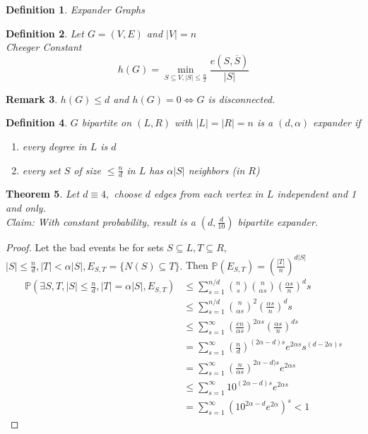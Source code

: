 \documentclass[a4paper]{article}
\newtheorem{thm}{Theorem}[section]
\newtheorem{defn}[thm]{Definition}
\newtheorem{rmk}[thm]{Remark}
\begin{document}
\begin{defn}
    Expander Graphs
\end{defn}
\begin{defn}
    Let $G=(V,E)$ and $|V|=n$\\
    Cheeger Constant $$h(G)=\min_{S\subseteq V, |S|\leq \frac{n}{2}}\frac{e(S,\overline{S})}{|S|}$$
\end{defn}
\begin{rmk}
    $h(G)\leq d$ and $h(G)=0\iff G$ is disconnected. 
\end{rmk}
\begin{defn}
    $G$ bipartite on $(L,R)$ with $|L|=|R|=n$ is a $(d,\alpha)$ expander if 
    \begin{enumerate}
        \item every degree in $L$ is $d$
        \item every set $S$ of size $\leq \frac{n}{d}$ in $L$ has $\alpha |S|$ neighbors (in $R$)
    \end{enumerate}
\end{defn}
\begin{thm}
    Let $d\equiv 4,$ choose $d$ edges from each vertex in $L$ independent and 1 and only. \\
    Claim: With constant probability, result is a $(d,\frac{d}{10})$ bipartite expander.
\end{thm}
\begin{proof}
    Let the bad events be for sets $S\subseteq L, T\subseteq R$, $|S|\leq \frac{n}{d}, |T|< \alpha|S|, E_{S,T}=\{N(S)\subseteq T\}.$ Then $\mathbb{P}(E_{S,T})=\left (\frac{|T|}{n} \right )^{d|S|}$
    \\
    \begin{align}
        \mathbb{P}(\exists S,T, |S|\leq \frac{n}{d}, |T|=\alpha|S|,E_{S,T})&\leq \sum_{s=1}^{n/d}{n \choose s}{n \choose \alpha s}\left (\frac{\alpha s}{n} \right )^ds\\
        &\leq \sum_{s=1}^{n/d}{n \choose \alpha s}^2\left ( \frac{\alpha s}{n}\right ) ^ds\\
        &\leq \sum_{s=1}^\infty \left ( \frac{en}{\alpha s}\right ) ^{2\alpha s} \left ( \frac{\alpha s}{n}\right )^{ds}\\
        &=\sum_{s=1}^\infty \left (\frac{n}{d} \right )^{(2\alpha -d)s}e^{2\alpha s}s^{(d-2\alpha)s}\\
        &=\sum_{s=1}^\infty \left ( \frac{n}{\alpha s}\right )^{2\alpha-d)s}e^{2\alpha s}\\
        &\leq \sum_{s=1}^\infty 10^{(2\alpha -d)s}e^{2\alpha s} \tag{$\alpha \leq d/10$}\\
        &=\sum_{s=1}^{\infty}\left (10^{2\alpha-d}e^{2\alpha} \right)^s<1 
    \end{align}
\end{proof}
\end{document}
